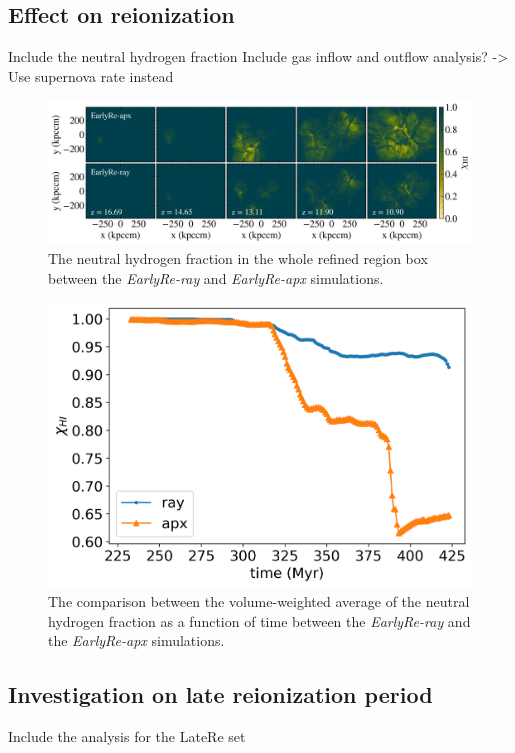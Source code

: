 \documentclass[linenumbers, twocolumn]{aastex631}
\begin{document}
\subsection{Effect on reionization}
Include the neutral hydrogen fraction 
Include gas inflow and outflow analysis? -> Use supernova rate instead

\begin{figure}
    \centering
    \includegraphics[width=\textwidth]{EarlyRe/neutralHfraction_comparison_multiple.png}
    \caption{The neutral hydrogen fraction in the whole refined region box between the \textit{EarlyRe-ray} and \textit{EarlyRe-apx} simulations.}
    \label{fig:neutralHfrac_map}
\end{figure}

\begin{figure}
    \centering
    \includegraphics[width=0.95\columnwidth]{EarlyRe/neutralHfraction_evolution.png}
    \caption{The comparison between the volume-weighted average of the neutral hydrogen fraction as a function of time between the \textit{EarlyRe-ray} and the \textit{EarlyRe-apx} simulations.}
    \label{fig:neutralHfrac_evolution}
\end{figure}


\subsection{Investigation on late reionization period}
Include the analysis for the LateRe set
\end{document}
